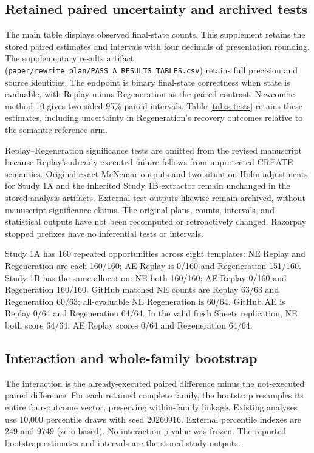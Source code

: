 \documentclass[conference]{IEEEtran}
\newcommand{\codeurl}[1]{{\def\UrlFont{\ttfamily}\nolinkurl{#1}}}
\begin{document}
\subsection{Retained paired uncertainty and archived tests}

{\raggedright The main table displays observed final-state counts. This supplement retains the stored paired estimates and intervals with four decimals of presentation rounding. The supplementary results artifact (\codeurl{paper/rewrite_plan/PASS_A_RESULTS_TABLES.csv}) retains full precision and source identities. The endpoint is binary final-state correctness when state is evaluable, with Replay minus Regeneration as the paired contrast. Newcombe method 10 gives two-sided 95\% paired intervals. Table \ref{tab:s-tests} retains these estimates, including uncertainty in Regeneration's recovery outcomes relative to the semantic reference arm.\par}


Replay--Regeneration significance tests are omitted from the revised manuscript because Replay's already-executed failure follows from unprotected CREATE semantics. Original exact McNemar outputs and two-situation Holm adjustments for Study 1A and the inherited Study 1B extractor remain unchanged in the stored analysis artifacts. External test outputs likewise remain archived, without manuscript significance claims. The original plans, counts, intervals, and statistical outputs have not been recomputed or retroactively changed. Razorpay stopped prefixes have no inferential tests or intervals.


Study 1A has 160 repeated opportunities across eight templates: NE Replay and Regeneration are each 160/160; AE Replay is 0/160 and Regeneration 151/160. Study 1B has the same allocation: NE both 160/160; AE Replay 0/160 and Regeneration 160/160. GitHub matched NE counts are Replay 63/63 and Regeneration 60/63; all-evaluable NE Regeneration is 60/64. GitHub AE is Replay 0/64 and Regeneration 64/64. In the valid fresh Sheets replication, NE both score 64/64; AE Replay scores 0/64 and Regeneration 64/64.




\subsection{Interaction and whole-family bootstrap}

The interaction is the already-executed paired difference minus the not-executed paired difference. For each retained complete family, the bootstrap resamples its entire four-outcome vector, preserving within-family linkage. Existing analyses use 10,000 percentile draws with seed 20260916. External percentile indexes are 249 and 9749 (zero based). No interaction p-value was frozen. The reported bootstrap estimates and intervals are the stored study outputs.
\end{document}
